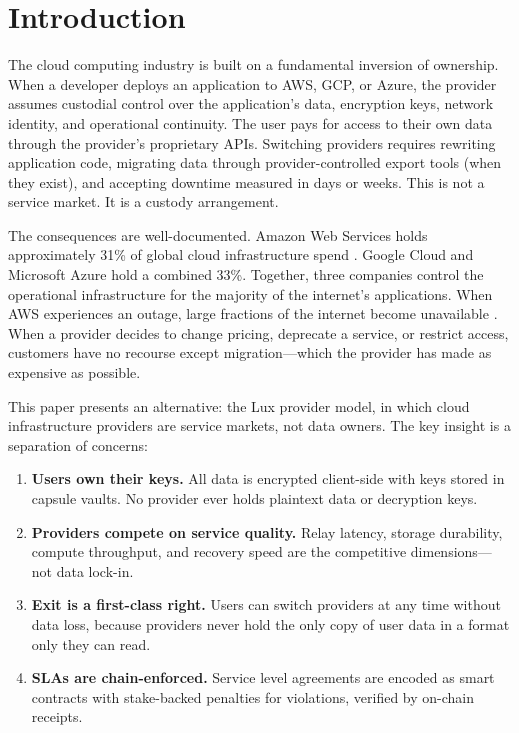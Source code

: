 \section{Introduction}
\label{sec:intro}

The cloud computing industry is built on a fundamental inversion of ownership.
When a developer deploys an application to AWS, GCP, or Azure, the provider
assumes custodial control over the application's data, encryption keys, network
identity, and operational continuity. The user pays for access to their own data
through the provider's proprietary APIs. Switching providers requires rewriting
application code, migrating data through provider-controlled export tools (when
they exist), and accepting downtime measured in days or weeks. This is not a
service market. It is a custody arrangement.

The consequences are well-documented. Amazon Web Services holds approximately 31\%
of global cloud infrastructure spend \cite{synergy2024cloud}. Google Cloud and
Microsoft Azure hold a combined 33\%. Together, three companies control the
operational infrastructure for the majority of the internet's applications. When
AWS experiences an outage, large fractions of the internet become unavailable
\cite{aws2021outage}. When a provider decides to change pricing, deprecate a
service, or restrict access, customers have no recourse except migration---which
the provider has made as expensive as possible.

This paper presents an alternative: the Lux provider model, in which cloud
infrastructure providers are service markets, not data owners. The key insight
is a separation of concerns:

\begin{enumerate}[label=(\roman*)]
    \item \textbf{Users own their keys.} All data is encrypted client-side with
    keys stored in capsule vaults. No provider ever holds plaintext data or
    decryption keys.
    \item \textbf{Providers compete on service quality.} Relay latency, storage
    durability, compute throughput, and recovery speed are the competitive
    dimensions---not data lock-in.
    \item \textbf{Exit is a first-class right.} Users can switch providers at
    any time without data loss, because providers never hold the only copy of
    user data in a format only they can read.
    \item \textbf{SLAs are chain-enforced.} Service level agreements are encoded
    as smart contracts with stake-backed penalties for violations, verified by
    on-chain receipts.
\end{enumerate}

